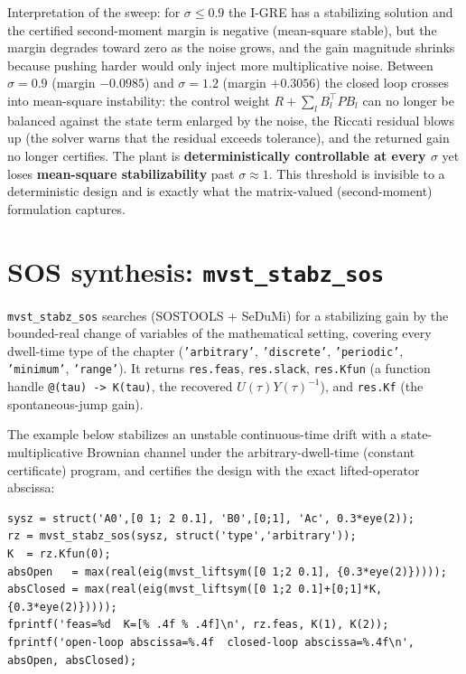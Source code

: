 \documentclass[11pt,oneside]{report}
\newcommand{\code}[1]{\texttt{#1}}
\begin{document}
Interpretation of the sweep: for \(\sigma\le0.9\) the I-GRE has a stabilizing solution and
the certified second-moment margin is negative (mean-square stable), but the
margin degrades toward zero as the noise grows, and the gain magnitude shrinks
because pushing harder would only inject more multiplicative noise. Between
\(\sigma=0.9\) (margin \(-0.0985\)) and \(\sigma=1.2\) (margin \(+0.3056\)) the closed
loop crosses into mean-square instability: the control weight
\(R+\sum_l B_l^{\top}P B_l\) can no longer be balanced against the state term
enlarged by the noise, the Riccati residual blows up (the solver warns that the residual
exceeds tolerance), and the returned gain no longer certifies. The plant is
\textbf{deterministically controllable at every \(\sigma\)} yet loses \textbf{mean-square
stabilizability} past \(\sigma\approx1\). This threshold is invisible to a
deterministic design and is exactly what the matrix-valued (second-moment)
formulation captures.

\hypertarget{sos-synthesis-mvst_stabz_sos}{%
\section{\texorpdfstring{SOS synthesis: \code{mvst\_stabz\_sos}}{SOS synthesis: mvst\_stabz\_sos}}\label{sos-synthesis-mvst_stabz_sos}}

\code{mvst\_stabz\_sos} searches (SOSTOOLS + SeDuMi) for a stabilizing gain by the
bounded-real change of variables of the mathematical setting, covering every
dwell-time type of the chapter (\code{'arbitrary'}, \code{'discrete'}, \code{'periodic'},
\code{'minimum'}, \code{'range'}). It returns \code{res.feas}, \code{res.slack}, \code{res.Kfun} (a
function handle \code{@(tau) -\textgreater{} K(tau)}, the recovered \(U(\tau)Y(\tau)^{-1}\)), and
\code{res.Kf} (the spontaneous-jump gain).

The example below stabilizes an unstable continuous-time drift with a
state-multiplicative Brownian channel under the arbitrary-dwell-time (constant
certificate) program, and certifies the design with the exact lifted-operator
abscissa:

\begin{lstlisting}[style=matlabstyle]
sysz = struct('A0',[0 1; 2 0.1], 'B0',[0;1], 'Ac', 0.3*eye(2));
rz = mvst_stabz_sos(sysz, struct('type','arbitrary'));
K  = rz.Kfun(0);
absOpen   = max(real(eig(mvst_liftsym([0 1;2 0.1], {0.3*eye(2)}))));
absClosed = max(real(eig(mvst_liftsym([0 1;2 0.1]+[0;1]*K, {0.3*eye(2)}))));
fprintf('feas=%d  K=[% .4f % .4f]\n', rz.feas, K(1), K(2));
fprintf('open-loop abscissa=%.4f  closed-loop abscissa=%.4f\n', absOpen, absClosed);
\end{lstlisting}
\end{document}
